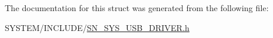 The documentation for this struct was generated from the following file\+:\begin{DoxyCompactItemize}
\item 
S\+Y\+S\+T\+E\+M/\+I\+N\+C\+L\+U\+D\+E/\hyperlink{SN__SYS__USB__DRIVER_8h}{S\+N\+\_\+\+S\+Y\+S\+\_\+\+U\+S\+B\+\_\+\+D\+R\+I\+V\+E\+R.\+h}\end{DoxyCompactItemize}
